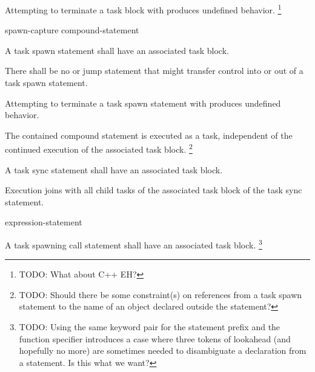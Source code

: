 \pnum
Attempting to terminate a task block with
produces undefined behavior.
\footnote{TODO:
What about C++ EH?
}


\begin{bnf}
\br
{}  spawn-capture\opt{} compound-statement
\end{bnf}


\pnum
A task spawn statement shall have an associated task block.

\pnum
There shall be no
or jump statement that might transfer control into or out of
a task spawn statement.

\pnum
Attempting to terminate a task spawn statement with
produces undefined behavior.

\pnum
The contained compound statement is executed as a task,
independent of the continued execution
of the associated task block.
\footnote{TODO:
Should there be some constraint(s) on references
from a task spawn statement
to the name of an object declared outside the statement?
}


\begin{bnf}
\br
{}  \terminal{;}
\end{bnf}


\pnum
A task sync statement shall have an associated task block.

\pnum
Execution joins with
all child tasks of the associated task block
of the task sync statement.

\begin{bnf}
\br
{}  expression-statement
\end{bnf}

\pnum
A task spawning call statement shall have an associated task block.
\footnote{TODO:
Using the same keyword pair
for the statement prefix and the function specifier
introduces a case where three tokens of lookahead
(and hopefully no more)
are sometimes needed
to disambiguate a declaration from a statement.
Is this what we want?
}

